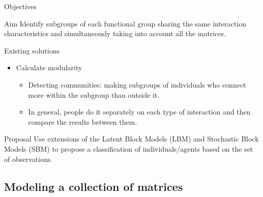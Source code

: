 \documentclass[compress,10pt]{beamer}
\begin{document}


\begin{frame}{Objectives}

\begin{block}{Aim}
Identify subgroups of each functional group sharing the same interaction characteristics and simultaneously taking into account all the matrices. 
\end{block}

\begin{block}{Existing solutions}
\begin{itemize}
\item Calculate modularity
\begin{itemize}
\item Detecting communities: making subgroups of individuals who connect more within the subgroup than outside it. 
\item In general, people do it separately on each type of interaction and then compare the results between them. 
\end{itemize}
\end{itemize}
\end{block}
\begin{block}{Proposal}
Use extensions of the Latent Block Models (LBM) and Stochastic Block Models (SBM) to propose a classification of individuals/agents based on the set of observations.
\end{block}
\end{frame}






\subsection{Modeling a collection of matrices}
\end{document}
